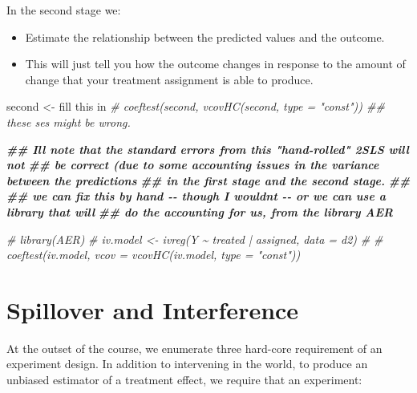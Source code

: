 \documentclass[
]{article}
\newenvironment{Shaded}{\begin{snugshade}}{\end{snugshade}}
\newcommand{\CommentTok}[1]{\textcolor[rgb]{0.56,0.35,0.01}{\textit{#1}}}
\newcommand{\DocumentationTok}[1]{\textcolor[rgb]{0.56,0.35,0.01}{\textbf{\textit{#1}}}}
\newcommand{\NormalTok}[1]{#1}
\newcommand{\OtherTok}[1]{\textcolor[rgb]{0.56,0.35,0.01}{#1}}
\newcommand{\StringTok}[1]{\textcolor[rgb]{0.31,0.60,0.02}{#1}}
\providecommand{\tightlist}{%
  \setlength{\itemsep}{0pt}\setlength{\parskip}{0pt}}
\begin{document}
In the second stage we:

\begin{itemize}
\tightlist
\item
  Estimate the relationship between the predicted values and the outcome.
\item
  This will just tell you how the outcome changes in response to the amount of change that your treatment assignment is able to produce.
\end{itemize}

\begin{Shaded}
\begin{Highlighting}[]
\NormalTok{second }\OtherTok{\textless{}{-}} \StringTok{\textquotesingle{}fill this in\textquotesingle{}}
\CommentTok{\# coeftest(second, vcovHC(second, type = "const")) \#\# these ses might be wrong. }
\end{Highlighting}
\end{Shaded}

\begin{Shaded}
\begin{Highlighting}[]
\DocumentationTok{\#\# I\textquotesingle{}ll note that the standard errors from this "hand{-}rolled" 2SLS will not}
\DocumentationTok{\#\# be correct (due to some accounting issues in the variance between the predictions}
\DocumentationTok{\#\# in the first stage and the second stage.}
\DocumentationTok{\#\#}
\DocumentationTok{\#\# we can fix this by hand {-}{-} though I wouldn\textquotesingle{}t {-}{-} or we can use a library that will}
\DocumentationTok{\#\# do the accounting for us, from the library AER}

\CommentTok{\# library(AER)}
\CommentTok{\# iv.model \textless{}{-} ivreg(Y \textasciitilde{} treated | assigned, data = d2)}
\CommentTok{\# }
\CommentTok{\# coeftest(iv.model, vcov = vcovHC(iv.model, type = "const"))}
\end{Highlighting}
\end{Shaded}

\hypertarget{spillover-and-interference}{%
\section{Spillover and Interference}\label{spillover-and-interference}}

At the outset of the course, we enumerate three hard-core requirement of an experiment design. In addition to intervening in the world, to produce an unbiased estimator of a treatment effect, we require that an experiment:
\end{document}
